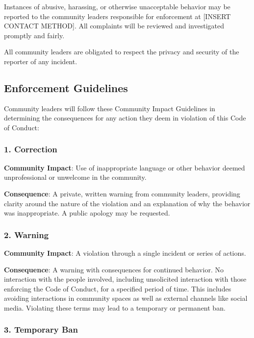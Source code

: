 \documentclass[
  fontsize=13pt,
  english,
  a4paper,
  openany, a4paper, oneside]{article}
\begin{document}
Instances of abusive, harassing, or otherwise unacceptable behavior may be
reported to the community leaders responsible for enforcement at
{[}INSERT CONTACT METHOD{]}.
All complaints will be reviewed and investigated promptly and fairly.

All community leaders are obligated to respect the privacy and security of the
reporter of any incident.

\hypertarget{enforcement-guidelines}{%
\subsection{Enforcement Guidelines}\label{enforcement-guidelines}}

Community leaders will follow these Community Impact Guidelines in determining
the consequences for any action they deem in violation of this Code of Conduct:

\hypertarget{correction}{%
\subsubsection{1. Correction}\label{correction}}

\textbf{Community Impact}: Use of inappropriate language or other behavior deemed
unprofessional or unwelcome in the community.

\textbf{Consequence}: A private, written warning from community leaders, providing
clarity around the nature of the violation and an explanation of why the
behavior was inappropriate. A public apology may be requested.

\hypertarget{warning}{%
\subsubsection{2. Warning}\label{warning}}

\textbf{Community Impact}: A violation through a single incident or series
of actions.

\textbf{Consequence}: A warning with consequences for continued behavior. No
interaction with the people involved, including unsolicited interaction with
those enforcing the Code of Conduct, for a specified period of time. This
includes avoiding interactions in community spaces as well as external channels
like social media. Violating these terms may lead to a temporary or
permanent ban.

\hypertarget{temporary-ban}{%
\subsubsection{3. Temporary Ban}\label{temporary-ban}}
\end{document}
